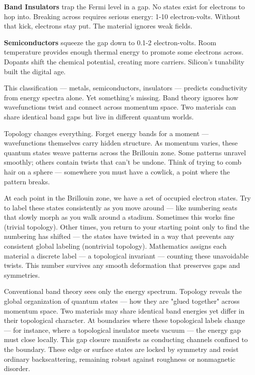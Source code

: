 \textbf{Band Insulators} trap the Fermi level in a gap. No states exist for electrons to hop into. Breaking across requires serious energy: 1-10 electron-volts. Without that kick, electrons stay put. The material ignores weak fields.

\textbf{Semiconductors} squeeze the gap down to 0.1-2 electron-volts. Room temperature provides enough thermal energy to promote some electrons across. Dopants shift the chemical potential, creating more carriers. Silicon's tunability built the digital age.

This classification — metals, semiconductors, insulators — predicts conductivity from energy spectra alone. Yet something's missing. Band theory ignores how wavefunctions twist and connect across momentum space. Two materials can share identical band gaps but live in different quantum worlds.

Topology changes everything. Forget energy bands for a moment — wavefunctions themselves carry hidden structure. As momentum varies, these quantum states weave patterns across the Brillouin zone. Some patterns unravel smoothly; others contain twists that can't be undone. Think of trying to comb hair on a sphere — somewhere you must have a cowlick, a point where the pattern breaks.

At each point in the Brillouin zone, we have a set of occupied electron states. Try to label these states consistently as you move around — like numbering seats that slowly morph as you walk around a stadium. Sometimes this works fine (trivial topology). Other times, you return to your starting point only to find the numbering has shifted — the states have twisted in a way that prevents any consistent global labeling (nontrivial topology). Mathematics assigns each material a discrete label — a topological invariant — counting these unavoidable twists. This number survives any smooth deformation that preserves gaps and symmetries.

Conventional band theory sees only the energy spectrum. Topology reveals the global organization of quantum states — how they are "glued together" across momentum space. Two materials may share identical band energies yet differ in their topological character. At boundaries where these topological labels change — for instance, where a topological insulator meets vacuum — the energy gap must close locally. This gap closure manifests as conducting channels confined to the boundary. These edge or surface states are locked by symmetry and resist ordinary backscattering, remaining robust against roughness or nonmagnetic disorder.

